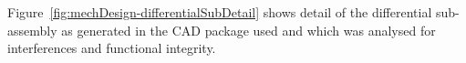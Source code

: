       \\\\
        Figure~\ref{fig:mechDesign-differentialSubDetail} shows detail of the differential sub-assembly as generated in the CAD package used and which was analysed for interferences and functional integrity.
        
        \begin{figure}[h!]
        \centering
        \qquad
\end{figure}
